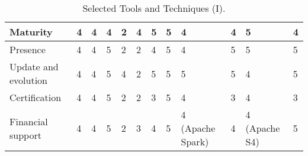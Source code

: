 \begin{sidewaystable}[!ht]
\begin{center}
\begin{tabular}[c]{|p{1.7cm}|p{1.5cm}|p{1.5cm}|p{1.5cm}|p{1.5cm}|p{1.5cm}|p{1.5cm}|p{1.5cm}|p{1.5cm}|p{1.5cm}|p{1.5cm}|p{1.5cm}|}
  Maturity & 4 & 4&  4& 2 & 4 & 5  & 5  & 4 & 4 & 5 &4 \\ \hline  
  Presence & 4 & 4 & 5 & 2 & 2 & 4 & 5 & 4 & 5 & 5 &5 \\ \hline  
  Update and evolution & 4 & 4 & 5  & 4 & 2 & 5 & 5 & 5 & 5 & 4 &5\\ \hline  
  Certification & 4 &4 & 5 & 2 & 2 & 3 & 5 & 4 & 3 & 4 & 3\\ \hline  
  Financial support & 4 & 4&  5 & 2 & 3 & 4 & 5 & 4 (Apache Spark) & 4  & 4 (Apache S4) & 5 \\ \hline  
  
\hline
\end{tabular}
\caption{Selected Tools and Techniques (I).}\label{table:tools-1}
  \end{center}
\end{sidewaystable} 

